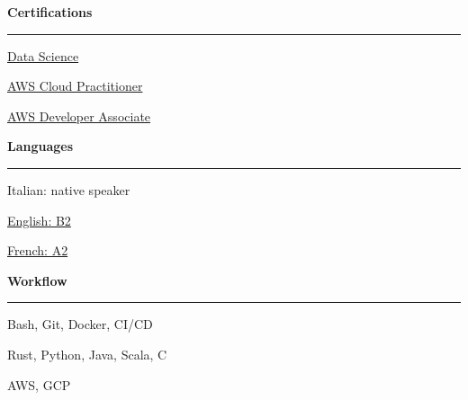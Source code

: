 \documentclass[11pt,letterpaper]{article}
\begin{document}
\begin{justify}
	\begin{multicols}{3}
		\textbf{Certifications}\strut
		\hrule
		\begin{itemize}[label={}, itemsep=-5pt, leftmargin=0pt]
			\begin{item}
			      \href{https://dariocurr.github.io/assets/doc/data_science.pdf}{Data Science}
			\end{item}
			\begin{item}
			      \href{https://www.credly.com/badges/33614ca6-2f0d-456b-87e9-bf8b8591cbf8/public_url}{AWS Cloud Practitioner}
			\end{item}
			\begin{item}
			      \href{https://www.credly.com/badges/e9b6c64c-2175-4345-950b-6331fd88af43/public_url}{AWS Developer Associate}
			\end{item}
		\end{itemize}
		\vspace*{\fill}
		\columnbreak
		\textbf{Languages}\strut
		\hrule
		\begin{itemize}[label={}, itemsep=-5pt, leftmargin=0pt]
			\begin{item}
			      Italian: native speaker
			\end{item}
			\begin{item}
			      \href{https://dariocurr.github.io/assets/doc/B2_english.pdf}{English: B2}
			\end{item}
			\begin{item}
			      \href{https://dariocurr.github.io/assets/doc/A2_french.pdf}{French: A2}
			\end{item}
		\end{itemize}
		\vspace*{\fill}
		\columnbreak
		\textbf{Workflow}\strut
		\hrule
		\begin{itemize}[label={}, itemsep=-5pt, leftmargin=0pt]
			\begin{item}
			      Bash, Git, Docker, CI/CD
			\end{item}
			\begin{item}
			      Rust, Python, Java, Scala, C
			\end{item}
			\begin{item}
			      AWS, GCP
			\end{item}
		\end{itemize}
		\vspace*{\fill}
	\end{multicols}
\end{justify}
\end{document}
